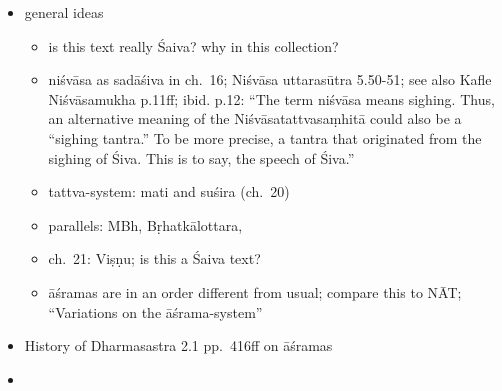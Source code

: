 \documentclass[11pt]{book}
\begin{document}
\begin{itemize}
\item
  general ideas

  \begin{itemize}
  
  \item
    is this text really Śaiva? why in this collection?
  \item
    niśvāsa as sadāśiva in ch.~16; Niśvāsa uttarasūtra 5.50-51; see also
    Kafle Niśvāsamukha p.11ff; ibid. p.12: ``The term niśvāsa means
    sighing. Thus, an alternative meaning of the Niśvāsatattvasaṃhitā
    could also be a ``sighing tantra.'' To be more precise, a tantra
    that originated from the sighing of Śiva. This is to say, the speech
    of Śiva.''
  \item
    tattva-system: mati and suśira (ch.~20)
  \item
    parallels: MBh, Bṛhatkālottara,
  \item
    ch.~21: Viṣṇu; is this a Śaiva text?
  \item
    āśramas are in an order different from usual; compare this to NĀT;
    ``Variations on the āśrama-system''
  \end{itemize}
\item
  History of Dharmasastra 2.1 pp.~416ff on āśramas
\item
  \begin{enumerate}
  \def\labelenumi{\alph{enumi}.}
  \setcounter{enumi}{13}
  

\end{enumerate}
\end{itemize}
\end{document}
